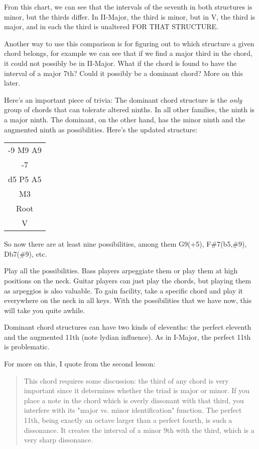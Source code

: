 Fron this chart, we can see that the intervals of the seventh in both
structures is minor, but the thirds differ. In II-Major, the third is
minor, but in V, the third is major, and in each the third is unaltered
FOR THAT STRUCTURE.

Another way to use this comparison is for figuring out to which structure
a given chord belongs, for example we can see that if we find a major
third in the chord, it could not possibly be in II-Major. What if the
chord is found to have the interval of a major 7th? Could it possibly
be a dominant chord? More on this later.

Here's an important piece of trivia: The dominant chord structure is the
\emph{only} group of chords that can tolerate altered ninths. In all other
families, the ninth is a major ninth. The dominant, on the other hand,
has the minor ninth and the augmented ninth as possibilities. Here's the
updated structure:

\begin{center}
\begin{tabular}{ | c | }
	\hline
	-9 M9 A9\\
	-7\\
	d5 P5 A5\\
	M3\\
	Root\\
	\hline
  V\\
  \hline
\end{tabular}
\end{center}

So now there are at least nine possibilities, among them G9(+5), F\#7(b5,\#9),
Db7(\#9), etc.

Play all the possibilities. Bass players arpeggiate them or play them at high
positions on the neck. Guitar players can just play the chords, but playing
them as arpeggios is also valuable. To gain facility, take a specific chord
and play it everywhere on the neck in all keys. With the possibilities that
we have now, this will take you quite awhile.

Dominant chord structures can have two kinds of elevenths: the perfect
eleventh and the augmented 11th (note lydian influence). As in I-Major,
the perfect 11th is problematic.

For more on this, I quote from the second lesson:

\begin{quote}
This chord requires some discussion: the third of any chord is very
important since it determines whether the triad is major or minor.
If you place a note in the chord which is overly dissonant with that
third, you interfere with its "major vs. minor identification" function.
The perfect 11th, being exactly an octave larger than a perfect fourth,
is such a dissonance. It creates the interval of a minor 9th with the
third, which is a very sharp dissonance.
\end{quote}

